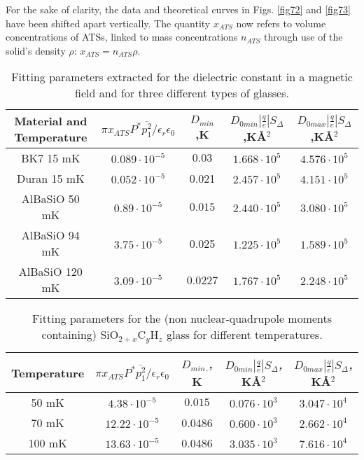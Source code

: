 \documentclass[10pt]{article}
\begin{document}
For the sake of clarity, the data and theoretical curves in Figs. \ref{fig72} and 
\ref{fig73} have been shifted apart vertically. The quantity $x_{ATS}$ now refers to
volume concentrations of ATSs, linked to mass concentrations $n_{ATS}$
through use of the solid's density $\rho$: $x_{ATS}=n_{ATS}\rho$.
\begin{table}[htbp]
\begin{center}
\begin{tabular}{ |c|c|c|c|c|}
\hline
Material and Temperature & ${\pi x_{ATS}P}^*\overline{p^2_1}/\epsilon_r\epsilon_0$ & $D_{min}$,K & $D_{0min}\left|\frac{q}{e}\right|S_{\Delta }$,KÅ$^{2}$ & $D_{0max}\left|\frac{q}{e}\right|S_{\Delta }$,KÅ$^{2}$  \\
\hline
BK7 15 mK & $0.089\cdot {10}^{-5}$ & $0.03$ & $1.668\cdot {10}^5$ & $4.576\cdot {10}^5$  \\
\hline
Duran 15 mK & $0.052\cdot {10}^{-5}$ & 0.021 & $2.457\cdot {10}^5$ & $4.151\cdot {10}^5$ \\
\hline
AlBaSiO 50 mK & $0.89\cdot {10}^{-5}$ & $0.015$ & $2.440\cdot {10}^5$ & $3.080\cdot {10}^5$ \\
\hline
AlBaSiO 94 mK & $3.75\cdot {10}^{-5}$ & 0.025 & $1.225\cdot {10}^5$ & $1.589\cdot {10}^5$ \\
\hline
AlBaSiO 120 mK & $3.09\cdot {10}^{-5}$ & 0.0227 & $1.767\cdot {10}^5$ & $2.248\cdot {10}^5$ \\
 \hline
\end{tabular}
\caption{Fitting parameters extracted for the dielectric constant in a magnetic field and
for three different types of glasses.}
 \label{tab71}
\end{center}
\end{table}

\begin{table}[htbp]
\begin{center}
\begin{tabular}{ |c|c|c|c|c|}
\hline
Temperature & ${\pi x_{ATS}P}^*\overline{p^2_1}/\epsilon_r\epsilon_0$ & $D_{min}$\textit{${}_{,}$, }K & $D_{0min}\left|\frac{q}{e}\right|S_{\Delta }$\textit{, }KÅ${}^{2}$ & $D_{0max}\left|\frac{q}{e}\right|S_{\Delta }$\textit{, }KÅ${}^{2}$ \\
\hline
50 mK & $4.38\cdot {10}^{-5}$ & $0.015$ & $0.076\cdot {10}^3$ & $3.047\cdot {10}^4$ \\
\hline
70 mK & $12.22\cdot {10}^{-5}$ & 0.0486 & $0.600\cdot {10}^3$ & $2.662\cdot {10}^4$ \\
\hline
100 mK & $13.63\cdot {10}^{-5}$ & 0.0486 & $3.035\cdot {10}^3$ & $7.616\cdot {10}^4$ \\
\hline
\end{tabular}
\caption{Fitting parameters for the (non nuclear-quadrupole moments containing) SiO${}_{2+}$\textit{${}_{x}$}C\textit{${}_{y}$}H\textit{${}_{z}$} glass for different temperatures.}
 \label{tab72}
\end{center}
\end{table}
\end{document}
